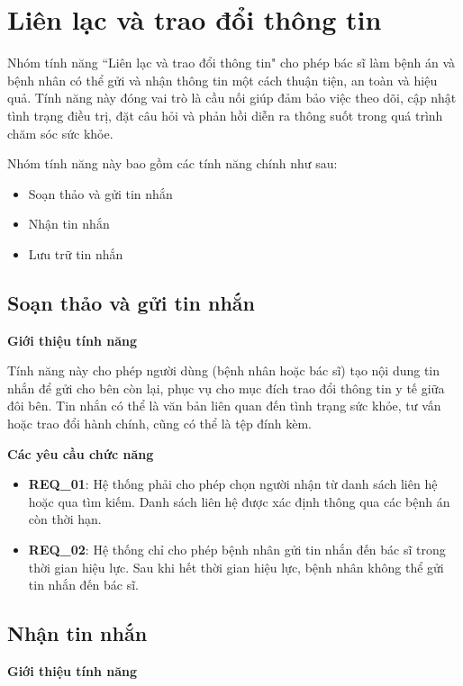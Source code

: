 \section{Liên lạc và trao đổi thông tin}

Nhóm tính năng ``Liên lạc và trao đổi thông tin" cho phép bác sĩ làm bệnh án và bệnh nhân có thể gửi và nhận thông tin một cách thuận tiện, an toàn và hiệu quả. Tính năng này đóng vai trò là cầu nối giúp đảm bảo việc theo dõi, cập nhật tình trạng điều trị, đặt câu hỏi và phản hồi diễn ra thông suốt trong quá trình chăm sóc sức khỏe.

Nhóm tính năng này bao gồm các tính năng chính như sau:
\begin{itemize}
  \item Soạn thảo và gửi tin nhắn
  \item Nhận tin nhắn
  \item Lưu trữ tin nhắn
\end{itemize}

\subsection{Soạn thảo và gửi tin nhắn}

\noindent \textbf{Giới thiệu tính năng}

Tính năng này cho phép người dùng (bệnh nhân hoặc bác sĩ) tạo nội dung tin nhắn để gửi cho bên còn lại, phục vụ cho mục đích trao đổi thông tin y tế giữa đôi bên. Tin nhắn có thể là văn bản liên quan đến tình trạng sức khỏe, tư vấn hoặc trao đổi hành chính, cũng có thể là tệp đính kèm.

\noindent \textbf{Các yêu cầu chức năng}

\begin{itemize}
  \item \textbf{REQ\_01}: Hệ thống phải cho phép chọn người nhận từ danh sách liên hệ hoặc qua tìm kiếm. Danh sách liên hệ được xác định thông qua các bệnh án còn thời hạn.
  \item \textbf{REQ\_02}: Hệ thống chỉ cho phép bệnh nhân gửi tin nhắn đến bác sĩ trong thời gian hiệu lực. Sau khi hết thời gian hiệu lực, bệnh nhân không thể gửi tin nhắn đến bác sĩ.
\end{itemize}

\subsection{Nhận tin nhắn}

\noindent \textbf{Giới thiệu tính năng}

